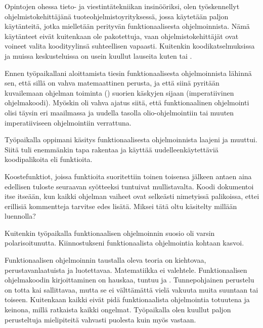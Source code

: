 Opintojen ohessa tieto- ja viestintätekniikan insinööriksi, olen työskennellyt ohjelmistokehittäjänä tuoteohjelmistoyrityksessä, jossa käytetään paljon käytänteitä, jotka mielletään perityvän funktionaalisesta ohjelmoinnista. Nämä käytänteet eivät kuitenkaan ole pakotettuja, vaan ohjelmistokehittäjät ovat voineet valita koodityylinsä suhteellisen vapaasti. Kuitenkin koodikatselmuksissa ja muissa keskusteluissa on usein kuullut lauseita kuten  tai .

Ennen työpaikallani aloittamista tiesin funktionaalisesta ohjelmoinnista lähinnä sen, että sillä on vahva matemaattinen perusta, ja että siinä pyritään kuvailemaan ohjelman toiminta () suorien käskyjen sijaan (imperatiivinen ohjelmakoodi). Myöskin oli vahva ajatus siitä, että funktionaalinen ohjelmointi olisi täysin eri maailmassa ja uudella tasolla olio-ohjelmointiin tai muuten imperatiiviseen ohjelmointiin verrattuna.

Työpaikalla oppimani käsitys funktionaalisesta ohjelmoinnista laajeni ja muuttui. Siitä tuli enemmänkin tapa rakentaa ja käyttää uudelleenkäytettäviä koodipalikoita eli funktioita.

Koostefunktiot, joissa funktioita suoritettiin toinen toisensa jälkeen antaen aina edellisen tuloste seuraavan syötteeksi tuntuivat mullistavalta. Koodi dokumentoi itse itseään, kun kaikki ohjelman vaiheet ovat selkeästi nimetyissä palikoissa, ettei erillisiä kommentteja tarvitse edes lisätä. Miksei tätä oltu käsitelty millään luennolla?

Kuitenkin työpaikalla funktionaalisen ohjelmoinnin suosio oli varsin polarisoitunutta. Kiinnostukseni funktionaalista ohjelmointia kohtaan kasvoi.

Funktionaalisen ohjelmoinnin taustalla oleva teoria on kiehtovaa, perustavanlaatuista ja luotettavaa. Matematiikka ei valehtele. Funktionaalisen ohjelmakoodin kirjoittaminen on hauskaa, tuntuu  ja . Tunnepohjainen perustelu on totta kai sallittavaa, mutta se ei välttämättä vielä vakuuta muita suuntaan tai toiseen. Kuitenkaan kaikki eivät pidä funktionaalista ohjelmointia totuutena ja keinona, millä ratkaista kaikki ongelmat. Työpaikalla olen kuullut paljon perusteltuja mielipiteitä vahvasti  puolesta kuin myös vastaan.

